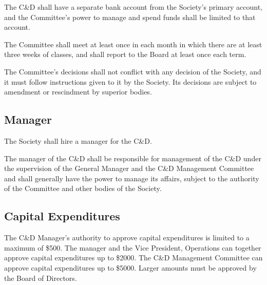 The C\&D shall have a separate bank account from the Society's primary account,
and the Committee's power to manage and spend funds shall be limited to that
account.

The Committee shall meet at least once in each month in which there are at
least three weeks of classes, and shall report to the Board at least once each
term.

The Committee's decisions shall not conflict with any decision of the Society,
and it must follow instructions given to it by the Society. Its decisions are
subject to amendment or rescindment by superior bodies.

\subsection{Manager}
The Society shall hire a manager for the C\&D.

The manager of the C\&D shall be responsible for management of the C\&D under
the supervision of the General Manager and the C\&D Management Committee and
shall generally have the power to manage its affairs, subject to the authority
of the Committee and other bodies of the Society.

\subsection{Capital Expenditures}
The C\&D Manager's authority to approve capital expenditures is limited to
a maximum of \$500. The manager and the Vice President, Operations can together
approve capital expenditures up to \$2000. The C\&D Management Committee can
approve capital expenditures up to \$5000. Larger amounts must be approved by
the Board of Directors.

